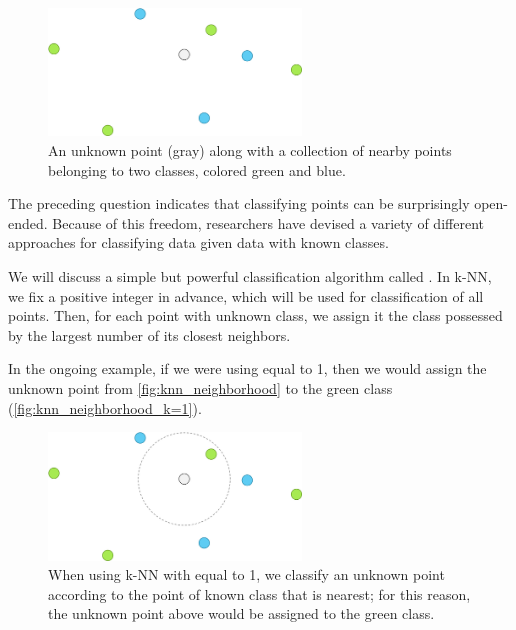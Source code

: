 \begin{qbox}\end{qbox}

\begin{figure}[h]
\centering
\mySfFamily
\includegraphics[width = 0.6\textwidth]{../images/knn_neighborhood.png}
\caption{An unknown point (gray) along with a collection of nearby points belonging to two classes, colored green and blue.}
\label{fig:knn_neighborhood}
\end{figure}

The preceding question indicates that classifying points can be surprisingly open-ended. Because of this freedom, researchers have devised a variety of different approaches for classifying data given data with known classes.

We will discuss a simple but powerful classification algorithm called . In k-NN, we fix a positive integer  in advance, which will be used for classification of all points. Then, for each point with unknown class, we assign it the class possessed by the largest number of its  closest neighbors.

In the ongoing example, if we were using  equal to 1, then we would assign the unknown point from \autoref{fig:knn_neighborhood} to the green class (\autoref{fig:knn_neighborhood_k=1}).\\

\begin{figure}[h]
\centering
\mySfFamily
\includegraphics[width = 0.6\textwidth]{../images/knn_neighborhood_k=1.png}
\caption{When using k-NN with  equal to 1, we classify an unknown point according to the point of known class that is nearest; for this reason, the unknown point above would be assigned to the green class.}
\label{fig:knn_neighborhood_k=1}
\end{figure}


